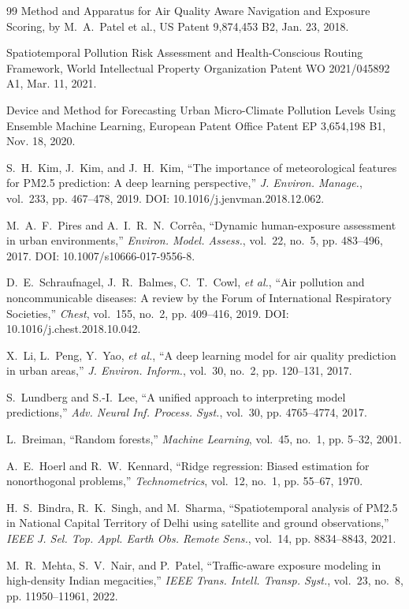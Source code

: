 \documentclass[journal]{IEEEtran}
\begin{document}
\begin{thebibliography}{99}
Method and Apparatus for Air Quality Aware Navigation and Exposure Scoring, by M.~A.~Patel et al., US Patent 9,874,453 B2, Jan. 23, 2018.

Spatiotemporal Pollution Risk Assessment and Health-Conscious Routing Framework, World Intellectual Property Organization Patent WO 2021/045892 A1, Mar. 11, 2021.

Device and Method for Forecasting Urban Micro-Climate Pollution Levels Using Ensemble Machine Learning, European Patent Office Patent EP 3,654,198 B1, Nov. 18, 2020.

S.~H.~Kim, J.~Kim, and J.~H.~Kim, ``The importance of meteorological features for PM2.5 prediction: A deep learning perspective,'' \emph{J. Environ. Manage.}, vol.~233, pp. 467--478, 2019. DOI: 10.1016/j.jenvman.2018.12.062.

M.~A.~F.~Pires and A.~I.~R.~N.~Corr\^ea, ``Dynamic human-exposure assessment in urban environments,'' \emph{Environ. Model. Assess.}, vol.~22, no.~5, pp. 483--496, 2017. DOI: 10.1007/s10666-017-9556-8.

D.~E.~Schraufnagel, J.~R.~Balmes, C.~T.~Cowl, \emph{et al.}, ``Air pollution and noncommunicable diseases: A review by the Forum of International Respiratory Societies,'' \emph{Chest}, vol.~155, no.~2, pp. 409--416, 2019. DOI: 10.1016/j.chest.2018.10.042.

X.~Li, L.~Peng, Y.~Yao, \emph{et al.}, ``A deep learning model for air quality prediction in urban areas,'' \emph{J. Environ. Inform.}, vol.~30, no.~2, pp. 120--131, 2017.

S.~Lundberg and S.-I.~Lee, ``A unified approach to interpreting model predictions,'' \emph{Adv. Neural Inf. Process. Syst.}, vol.~30, pp. 4765--4774, 2017.

L.~Breiman, ``Random forests,'' \emph{Machine Learning}, vol.~45, no.~1, pp. 5--32, 2001.

A.~E.~Hoerl and R.~W.~Kennard, ``Ridge regression: Biased estimation for nonorthogonal problems,'' \emph{Technometrics}, vol.~12, no.~1, pp. 55--67, 1970.

H.~S.~Bindra, R.~K.~Singh, and M.~Sharma, ``Spatiotemporal analysis of PM2.5 in National Capital Territory of Delhi using satellite and ground observations,'' \emph{IEEE J. Sel. Top. Appl. Earth Obs. Remote Sens.}, vol.~14, pp. 8834--8843, 2021.

M.~R.~Mehta, S.~V.~Nair, and P.~Patel, ``Traffic-aware exposure modeling in high-density Indian megacities,'' \emph{IEEE Trans. Intell. Transp. Syst.}, vol.~23, no.~8, pp. 11950--11961, 2022.

\end{thebibliography}
\end{document}
